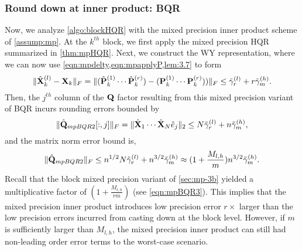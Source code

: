 
\subsubsection{Round down at inner product: BQR}
Now, we analyze \cref{algo:blockHQR} with the mixed precision inner product scheme of \cref{assump:mp}. 
At the $k^{th}$ block, we first apply the mixed precision HQR summarized in \cref{thm:mpHQR}.
Next, we construct the WY representation, where we can now use \cref{eqn:mpdelty,eqn:mpapplyP,lem:3.7} to form
\begin{equation}
	\|\hat{\mathbf{X}}_{k}^{(l)}- \mathbf{X}_k\|_F = \|(\hat{\mathbf{P}}_k^{(1)}\cdots \hat{\mathbf{P}}_k^{(r)})-(\mathbf{P}_k^{(1)}\cdots \mathbf{P}_k^{(r)}))\|_F \leq \tilde{\gamma}_{r}^{(l)} + r\tilde{\gamma}_{m}^{(h)}.
\end{equation}
Then, the $j^{th}$ column of the $\mathbf{Q}$ factor resulting from this mixed precision variant of BQR incurs rounding errors bounded by
\begin{equation}
	\|\hat{\mathbf{Q}}_{mpBQR2}[:,j]\|_F = \|\hat{\mathbf{X}}_1\cdots\hat{\mathbf{X}}_N\hat{e}_j\|_2\leq N\tilde{\gamma}_{r}^{(l)} + n\tilde{\gamma}_{m}^{(h)},
\end{equation}
and the matrix norm error bound is, 
\begin{equation}
	\|\hat{\bb{Q}}_{mpBQR2}\|_F \leq n^{1/2}N\tilde{\gamma}_{r}^{(l)} + n^{3/2}\tilde{\gamma}_{m}^{(h)} \approx (1+\frac{M_{l,h}}{m})n^{3/2}\tilde{\gamma}_{m}^{(h)}. \label{eqn:mpBQR2}
\end{equation}
Recall that the block mixed precision variant of \cref{sec:mp-3b} yielded a multiplicative factor of $(1+\frac{M_{l,h}}{rm})$ (see \cref{eqn:mpBQR3}).
This implies that the mixed precision inner product introduces low precision error $r\times $ larger than the low precision errors incurred from casting down at the block level.
However, if $m$ is sufficiently larger than $M_{l,h}$, the mixed precision inner product can still had non-leading order error terms to the worst-case scenario.
